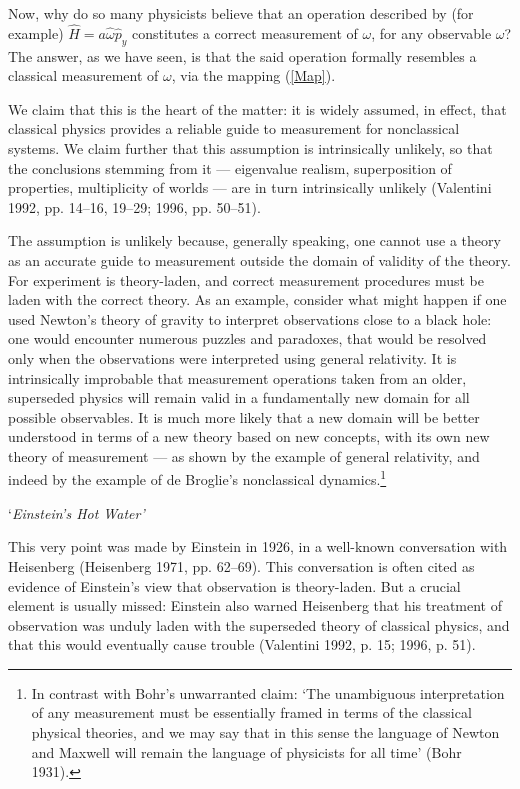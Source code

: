 \documentclass{article}%
\begin{document}
Now, why do so many physicists believe that an operation described by (for
example) $\hat{H}=a\hat{\omega}\hat{p}_{y}$ constitutes a correct measurement
of $\omega$, for any observable $\omega$? The answer, as we have seen, is that
the said operation formally resembles a classical measurement of $\omega$, via
the mapping (\ref{Map}).

We claim that this is the heart of the matter: it is widely assumed, in
effect, that classical physics provides a reliable guide to measurement for
nonclassical systems. We claim further that this assumption is intrinsically
unlikely, so that the conclusions stemming from it --- eigenvalue realism,
superposition of properties, multiplicity of worlds --- are in turn
intrinsically unlikely (Valentini 1992, pp. 14--16, 19--29; 1996, pp. 50--51).

The assumption is unlikely because, generally speaking, one cannot use a
theory as an accurate guide to measurement outside the domain of validity of
the theory. For experiment is theory-laden, and correct measurement procedures
must be laden with the correct theory. As an example, consider what might
happen if one used Newton's theory of gravity to interpret observations close
to a black hole: one would encounter numerous puzzles and paradoxes, that
would be resolved only when the observations were interpreted using general
relativity. It is intrinsically improbable that measurement operations taken
from an older, superseded physics will remain valid in a fundamentally new
domain for all possible observables. It is much more likely that a new domain
will be better understood in terms of a new theory based on new concepts, with
its own new theory of measurement --- as shown by the example of general
relativity, and indeed by the example of de Broglie's nonclassical
dynamics.\footnote{In contrast with Bohr's unwarranted claim: `The unambiguous
interpretation of any measurement must be essentially framed in terms of the
classical physical theories, and we may say that in this sense the language of
Newton and Maxwell will remain the language of physicists for all time' (Bohr
1931).}

\begin{center}
`\textit{Einstein's Hot Water'}
\end{center}

This very point was made by Einstein in 1926, in a well-known conversation
with Heisenberg (Heisenberg 1971, pp. 62--69). This conversation is often
cited as evidence of Einstein's view that observation is theory-laden. But a
crucial element is usually missed: Einstein also warned Heisenberg that his
treatment of observation was unduly laden with the superseded theory of
classical physics, and that this would eventually cause trouble (Valentini
1992, p. 15; 1996, p. 51).
\end{document}
